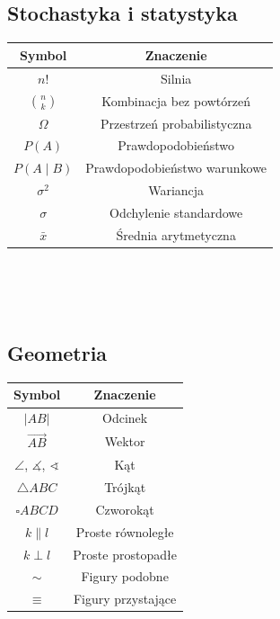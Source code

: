 \documentclass[14pt,a4paper]{extarticle}
\begin{document}
\begin{multicols}{2}

\subsection{Stochastyka i statystyka}

\begin{tabular}{*{2}{|c}|}
\hline
{} Symbol & Znaczenie \\
\hline
$n!$ & Silnia \\
$\binom{n}{k}$ & Kombinacja bez powtórzeń \\
$\Omega$ & Przestrzeń probabilistyczna \\
$P(A)$ & Prawdopodobieństwo \\
$P(A \mid\! B)$ & Prawdopodobieństwo warunkowe \\
$\sigma^{2}$ & Wariancja \\
$\sigma$ & Odchylenie standardowe \\
$\bar{x}$ & Średnia arytmetyczna \\
\hline
\end{tabular}
\\\\\\

\subsection*{\hspace{2cm}Geometria}

\hskip2.0cm
\begin{tabular}{*{2}{|c}|}
\hline
{} Symbol & Znaczenie \\
\hline
$\vert AB\vert$ & Odcinek \\
$\overset{\longrightarrow}{AB}$ & Wektor \\
$\angle{}$, $\measuredangle{}$, $\sphericalangle{}$ & Kąt \\
$\triangle ABC$ & Trójkąt \\
$\square ABCD$ & Czworokąt \\
$k \parallel l$ & Proste równoległe \\
$k \perp l$ & Proste prostopadłe \\
$\sim$ & Figury podobne \\
$\equiv$ & Figury przystające \\
\hline
\end{tabular}

\end{multicols}
\end{document}
